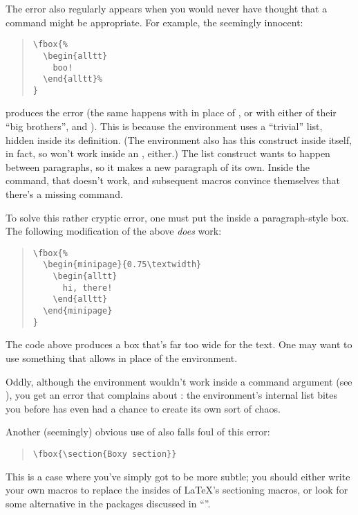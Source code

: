 {The error also regularly appears when you would never have thought
that a  command  might be appropriate.  For example, the
seemingly innocent:
\begin{quote}
\begin{verbatim}
\fbox{%
  \begin{alltt}
    boo!
  \end{alltt}%
}
\end{verbatim}
\end{quote}
produces the error (the same happens with  in place of
, or with either of their ``big brothers'',  and
).  This is because the  environment
uses a ``trivial'' list, hidden inside its definition.  (The
 environment also has this construct inside
itself, in fact, so  won't work inside an
, either.)  The list construct wants to happen between
paragraphs, so it makes a new paragraph of its own.  Inside the
 command, that doesn't work, and subsequent macros convince
themselves that there's a missing  command.

To solve this rather cryptic error, one must put the
 inside a paragraph-style box.  The following
modification of the above \emph{does} work:
\begin{quote}
\begin{verbatim}
\fbox{%
  \begin{minipage}{0.75\textwidth}
    \begin{alltt}
      hi, there!
    \end{alltt}
  \end{minipage}
}
\end{verbatim}
\end{quote}
The code above produces a box that's far too wide for the text.  One
may want to use something that allows %
 in place of the
 environment.

Oddly, although the  environment wouldn't work
inside a  command argument (see %
), you
get an error that complains about : the environment's
internal list bites you before  has even had a
chance to create its own sort of chaos.

Another (seemingly) obvious use of  also falls foul of this
error:
\begin{quote}
\begin{verbatim}
\fbox{\section{Boxy section}}
\end{verbatim}
\end{quote}
This is a case where you've simply got to be more subtle; you should
either write your own macros to replace the insides of \LaTeX{}'s
sectioning macros, or  look for some alternative in the packages
discussed in %
``''.

}
